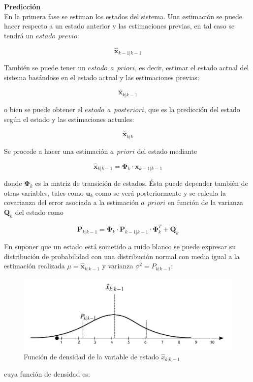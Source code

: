 \documentclass[twoside,11pt]{book}
\begin{document}
\textbf{Predicción}\\

En la primera fase se estiman los estados del sistema. Una estimación se puede hacer respecto a un estado anterior y las estimaciones previas, en tal caso se tendrá un $estado \>\> previo$:

\begin{equation}
\hat{\mathbf{x}}_{k-1|k-1}
\end{equation}

También se puede tener un $estado \>\> a \>\> priori$, es decir, estimar el estado actual del sistema basándose en el estado actual y las estimaciones previas:

\begin{equation}
\hat{\mathbf{x}}_{k|k-1}
\end{equation}

o bien se puede obtener el $estado \>\> a \>\> posteriori$, que es la predicción del estado según el estado y las estimaciones actuales:

\begin{equation}
\hat{\mathbf{x}}_{k|k}
\end{equation}

Se procede a hacer una estimación $a \>\> priori$ del estado mediante

\begin{equation}
\hat{\mathbf{x}}_{k|k-1} =\mathbf{\Phi}_{k} \cdot \mathbf{x}_{k-1|k-1}
\end{equation}

donde $\mathbf{\Phi}_{k}$ es la matriz de transición de estados. Ésta puede depender también de otras variables, tales como $\mathbf{u}_{k}$ como se verá posteriormente y se calcula la covarianza del error asociada a la estimación $a \>\> priori$ en función de la varianza $\mathbf{Q}_{k}$ del estado como

\begin{equation}
\mathbf{P}_{k|k-1}=\mathbf{\Phi}_{k} \cdot \mathbf{P}_{k-1|k-1} \cdot \mathbf{\Phi}_{k}^{T} + \mathbf{Q}_{k}
\end{equation}

En suponer que un estado está sometido a ruido blanco se puede expresar su distribución de probabilidad con una distribución normal con media igual a la estimación realizada $\mu=\hat{\pmb{x}}_{k|k-1}$ y varianza $\sigma^{2}=P_{k|k-1}$:

\begin{figure}[h!]
\begin{center}
\includegraphics[scale=0.35,bb=0 0 800 327]{images/fun_dens_x.png}
\caption{Función de densidad de la variable de estado $\hat{x}_{k|k-1}$}
\end{center}
\end{figure}
\newpage
cuya función de densidad es:
\end{document}
